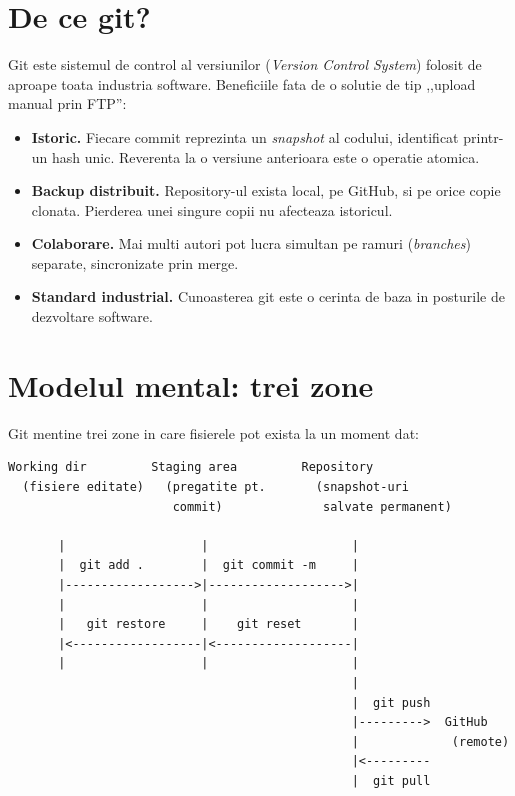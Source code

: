 \section{De ce git?}

Git este sistemul de control al versiunilor (\emph{Version Control System}) folosit de aproape toata industria software. Beneficiile fata de o solutie de tip ,,upload manual prin FTP'':

\begin{itemize}
  \item \textbf{Istoric.} Fiecare commit reprezinta un \emph{snapshot} al codului, identificat printr-un hash unic. Reverenta la o versiune anterioara este o operatie atomica.
  \item \textbf{Backup distribuit.} Repository-ul exista local, pe GitHub, si pe orice copie clonata. Pierderea unei singure copii nu afecteaza istoricul.
  \item \textbf{Colaborare.} Mai multi autori pot lucra simultan pe ramuri (\emph{branches}) separate, sincronizate prin merge.
  \item \textbf{Standard industrial.} Cunoasterea git este o cerinta de baza in posturile de dezvoltare software.
\end{itemize}

\section{Modelul mental: trei zone}

Git mentine trei zone in care fisierele pot exista la un moment dat:

\begin{lstlisting}[style=base, basicstyle=\ttfamily\small, numbers=none]
  Working dir         Staging area         Repository
  (fisiere editate)   (pregatite pt.       (snapshot-uri
                       commit)              salvate permanent)

       |                   |                    |
       |  git add .        |  git commit -m     |
       |------------------>|------------------->|
       |                   |                    |
       |   git restore     |    git reset       |
       |<------------------|<-------------------|
       |                   |                    |
                                                |
                                                |  git push
                                                |--------->  GitHub
                                                |             (remote)
                                                |<---------
                                                |  git pull
\end{lstlisting}

